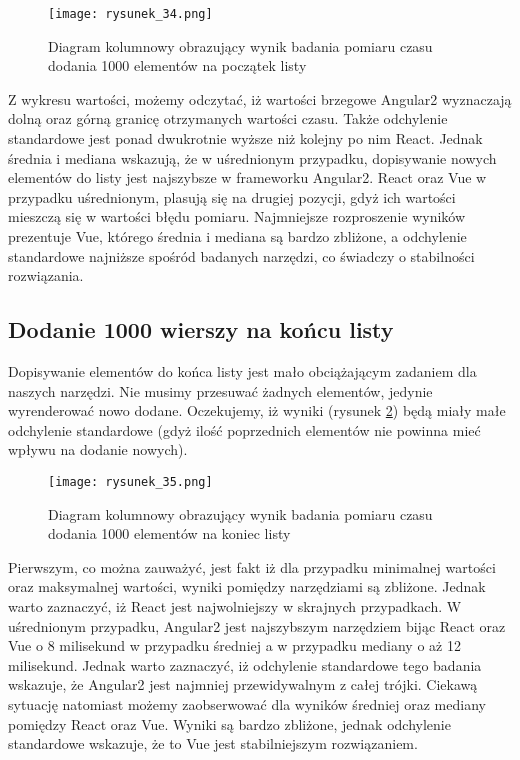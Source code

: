 \begin{figure}[htbp]
    \centering
    \texttt{[image: rysunek\_34.png]}
    \caption{Diagram kolumnowy obrazujący wynik badania pomiaru czasu dodania 1000 elementów na początek listy}
    \label{fig:rysunek_34}
\end{figure}

Z wykresu wartości, możemy odczytać, iż wartości brzegowe Angular2 wyznaczają dolną oraz górną granicę otrzymanych wartości czasu.
Także odchylenie standardowe jest ponad dwukrotnie wyższe niż kolejny po nim React.
Jednak średnia i mediana wskazują, że w uśrednionym przypadku, dopisywanie nowych elementów do listy jest najszybsze w frameworku Angular2.
React oraz Vue w przypadku uśrednionym, plasują się na drugiej pozycji, gdyż ich wartości mieszczą się w wartości błędu pomiaru.
Najmniejsze rozproszenie wyników prezentuje Vue, którego średnia i mediana są bardzo zbliżone,
a odchylenie standardowe najniższe spośród badanych narzędzi, co świadczy o stabilności rozwiązania.

\clearpage
\subsection{Dodanie 1000 wierszy na końcu listy}

Dopisywanie elementów do końca listy jest mało obciążającym zadaniem dla naszych narzędzi. Nie musimy przesuwać żadnych elementów, jedynie wyrenderować nowo dodane.
Oczekujemy, iż wyniki (rysunek \ref{fig:rysunek_35}) będą miały małe odchylenie standardowe (gdyż ilość poprzednich elementów nie powinna mieć wpływu na dodanie nowych).

\begin{figure}[htbp]
    \centering
    \texttt{[image: rysunek\_35.png]}
    \caption{Diagram kolumnowy obrazujący wynik badania pomiaru czasu dodania 1000 elementów na koniec listy}
    \label{fig:rysunek_35}
\end{figure}

Pierwszym, co można zauważyć, jest fakt iż dla przypadku minimalnej wartości oraz maksymalnej wartości, wyniki pomiędzy narzędziami są zbliżone.
Jednak warto zaznaczyć, iż React jest najwolniejszy w skrajnych przypadkach.
W uśrednionym przypadku, Angular2 jest najszybszym narzędziem bijąc React oraz Vue o 8 milisekund w przypadku średniej a w przypadku mediany o aż 12 milisekund.
Jednak warto zaznaczyć, iż odchylenie standardowe tego badania wskazuje, że Angular2 jest najmniej przewidywalnym z całej trójki.
Ciekawą sytuację natomiast możemy zaobserwować dla wyników średniej oraz mediany pomiędzy React oraz Vue.
Wyniki są bardzo zbliżone, jednak odchylenie standardowe wskazuje, że to Vue jest stabilniejszym rozwiązaniem.

